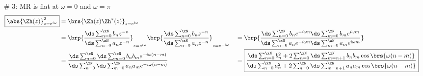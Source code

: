 %

\# 3: MR is flat at $\omega=0$ and $\omega=\pi$ \label{equ:mrflat}
\begin{align*}
  \boxed{\abs{\Zh(z)}^2_{z=e^{i\omega}}} 
    &= \brs{\Zh(z)\Zh^\ast(z)}_{z=e^{i\omega}}
  \\&= \brp{\frac{\ds\sum_{n=0}^{\xN}b_n z^{-n}}{\ds\sum_{n=0}^{\xN}a_n z^{-n}}}_{z=e^{i\omega}}  
       \brp{\frac{\ds\sum_{n=0}^{\xN}b_n z^{-n}}{\ds\sum_{n=0}^{\xN}a_n z^{-n}}}_{z=e^{-i\omega}}  
   &&= \brp{\frac{\ds\sum_{n=0}^{\xN}b_n e^{-i\omega n}\ds\sum_{m=0}^{\xN}b_m e^{i\omega m}}
                 {\ds\sum_{n=0}^{\xN}a_n e^{-i\omega n}\ds\sum_{m=0}^{\xN}a_m e^{i\omega m}}}
  \\&=     {\frac{\ds\sum_{n=0}^{\xN}\ds\sum_{m=0}^{\xN} b_n b_m e^{-i\omega(n-m)}}
                 {\ds\sum_{n=0}^{\xN}\ds\sum_{m=0}^{\xN} a_n a_m e^{-i\omega(n-m)}}}
   &&=\boxed{\frac{\ds\sum_{n=0}^{\xN}b_n^2 + 2\sum_{n=0}^{\xN}\ds\sum_{m=n+1}^{\xN} b_n b_m \cos\brs{\omega(n-m)}}
                  {\ds\sum_{n=0}^{\xN}a_n^2 + 2\sum_{n=0}^{\xN}\ds\sum_{m=n+1}^{\xN} a_n a_m \cos\brs{\omega(n-m)}}}
\end{align*}\label{equ:mr}

